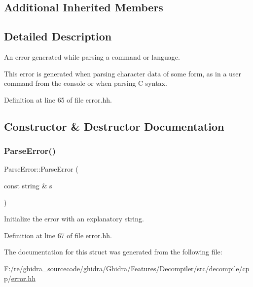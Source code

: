 \subsection*{Additional Inherited Members}


\subsection{Detailed Description}
An error generated while parsing a command or language. 

This error is generated when parsing character data of some form, as in a user command from the console or when parsing C syntax. 

Definition at line 65 of file error.\+hh.



\subsection{Constructor \& Destructor Documentation}
\mbox{\label{struct_parse_error_a0daea4d0229631f06ccd34670224ee19}} 
\subsubsection{\texorpdfstring{ParseError()}{ParseError()}}
{\footnotesize\ttfamily Parse\+Error\+::\+Parse\+Error (\begin{DoxyParamCaption}\item[{const string \&}]{s }\end{DoxyParamCaption})\hspace{0.3cm}{\ttfamily [inline]}}



Initialize the error with an explanatory string. 



Definition at line 67 of file error.\+hh.



The documentation for this struct was generated from the following file\+:\begin{DoxyCompactItemize}
\item 
F\+:/re/ghidra\+\_\+sourcecode/ghidra/\+Ghidra/\+Features/\+Decompiler/src/decompile/cpp/\mbox{\hyperlink{error_8hh}{error.\+hh}}\end{DoxyCompactItemize}
